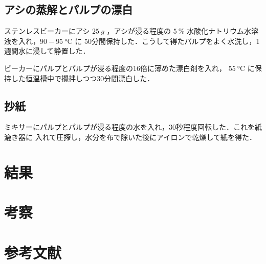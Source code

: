 \documentclass[uplatex, dvipdfmx, 10pt]{jarticle}
\begin{document}
           \subsection*{アシの蒸解とパルプの漂白}
                
                ステンレスビーカーにアシ $\SI{25}{g}$ ，アシが浸る程度の
                $\SI{5}{\%}$ 水酸化ナトリウム水溶液を入れ，$90-\SI{95}{\celsius}$ に
                50分間保持した．こうして得たパルプをよく水洗し，1週間水に浸して静置した．

                ビーカーにパルプとパルプが浸る程度の16倍に薄めた漂白剤を入れ，
                $\SI{55}{\celsius}$ に保持した恒温槽中で攪拌しつつ30分間漂白した．

            \subsection*{抄紙}

                ミキサーにパルプとパルプが浸る程度の水を入れ，30秒程度回転した．これを紙漉き器に
                入れて圧搾し，水分を布で除いた後にアイロンで乾燥して紙を得た．


        \section*{結果}

        \section*{考察}

        \section*{参考文献}

        
    
\end{document}
